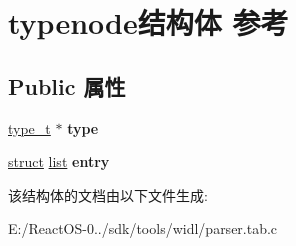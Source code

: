 \hypertarget{structtypenode}{}\section{typenode结构体 参考}
\label{structtypenode}
\subsection*{Public 属性}
\begin{DoxyCompactItemize}
\item 
\mbox{\label{structtypenode_a39536c0cf734c466f2e36f7adf4f82fb}} 
\hyperlink{struct__type__t}{type\+\_\+t} $\ast$ {\bfseries type}
\item 
\mbox{\label{structtypenode_ac83318f72050599b727c62f1af828b79}} 
\hyperlink{interfacestruct}{struct} \hyperlink{classlist}{list} {\bfseries entry}
\end{DoxyCompactItemize}


该结构体的文档由以下文件生成\+:\begin{DoxyCompactItemize}
\item 
E\+:/\+React\+O\+S-\/0../sdk/tools/widl/parser.\+tab.\+c\end{DoxyCompactItemize}
